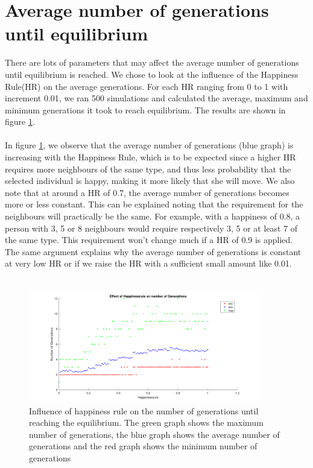 
\section{Average number of generations until equilibrium}
There are lots of parameters that may affect the average number of generations until  equilibrium is reached. We chose to look at the influence of the Happiness Rule(HR) on the average generations. For each HR ranging from 0 to 1 with increment 0.01, we ran 500 simulations and calculated the average, maximum and minimum generations it took to reach equilibrium. The results are shown in figure \ref{fig:avegen}.\\
\\
In figure \ref{fig:avegen}, we observe that the average number of generations (blue graph) is increasing with the Happiness Rule, which is to be expected since a higher HR requires more neighbours of the same type, and thus less probability that the selected individual is happy, making it more likely that she will move. We also note that at around a HR of 0.7, the average number of generations becomes more or less constant. This can be explained noting that the requirement for the neighbours will practically be the same. For example, with a happiness of 0.8, a person with 3, 5 or 8 neighbours would require respectively 3, 5 or at least 7 of the same type. This requirement won't change much if a HR of 0.9 is applied. The same argument explains why the average number of generations is constant at very low HR or if we raise the HR with a sufficient small amount like 0.01.\\
\\
\begin{figure}[h!]
    \centering
    \includegraphics[width=0.9\textwidth]{happinessregel_aantgen_2.pdf}
    \caption{Influence of happiness rule on the number of generations until reaching the equilibrium. The green graph shows the maximum number of generations, the blue graph shows the average number of generations and the red graph shows the minimum number of generations}
    \label{fig:avegen}
\end{figure}
